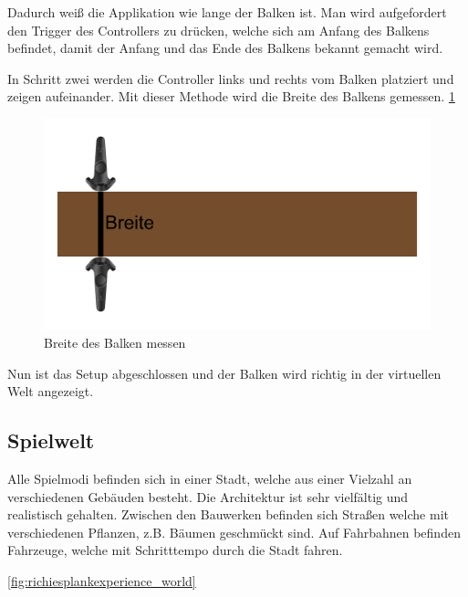Dadurch weiß die Applikation wie lange der Balken ist.
Man wird aufgefordert den Trigger des Controllers zu drücken, welche sich am Anfang des Balkens befindet, damit der Anfang und das Ende des Balkens bekannt gemacht wird.



In Schritt zwei werden die Controller links und rechts vom Balken platziert und zeigen aufeinander.
Mit dieser Methode wird die Breite des Balkens gemessen.
\ref{fig:beam_width_measurement} %

\begin {figure}
    \includegraphics[scale=0.18]{pics/beam_width_measurement}
    \caption{Breite des Balken messen}
    \label{fig:beam_width_measurement}
\end {figure}


Nun ist das Setup abgeschlossen und der Balken wird richtig in der virtuellen Welt angezeigt.
~\cite{ToastGames_2021_Setup}

\subsection{Spielwelt}
\label{sec:richiesplankexperience_world}
Alle Spielmodi befinden sich in einer Stadt, welche aus einer Vielzahl an verschiedenen Gebäuden besteht.
Die Architektur ist sehr vielfältig und realistisch gehalten.
Zwischen den Bauwerken befinden sich Straßen welche mit verschiedenen Pflanzen, z.B. Bäumen geschmückt sind.
Auf Fahrbahnen befinden Fahrzeuge, welche mit Schritttempo durch die Stadt fahren.

\ref{fig:richiesplankexperience_world} %


